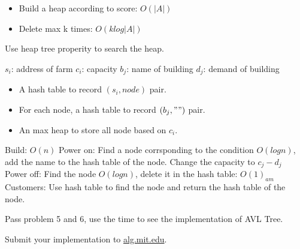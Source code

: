 \documentclass[12pt,twoside]{article}
\begin{document}
\begin{problems}
\problem  %

\begin{problemparts}
\problempart %
\begin{itemize}
    \item Build a heap according to score: $O(|A|)$
    \item Delete max k times: $O(klog|A|)$
\end{itemize}


\problempart %
Use heap tree properity to search the heap.
\end{problemparts}

\problem  %
$s_i$: address of farm $c_i$: capacity $b_j$: name of building $d_j$: demand of building
\begin{itemize}
    \item A hash table to record $(s_i, node)$ pair.
    \item For each node, a hash table to record $(b_j, "")$ pair.
    \item An max heap to store all node based on $c_i$.
\end{itemize}
Build: $O(n)$
Power on: Find a node corrsponding to the condition $O(logn)$, add the name to 
the hash table of the node. Change the capacity to $c_j - d_j$
Power off: Find the node $O(logn)$, delete it in the hash table: $O(1)_{am}$
Customers: Use hash table to find the node and return the hash table of the node.

\newpage
\problem  %
Pass problem 5 and 6, use the time to see the implementation of AVL Tree.

\problem  %
\begin{problemparts}
\problempart %
\problempart %
\problempart %
\problempart Submit your implementation to {\small\url{alg.mit.edu}}.
\end{problemparts}

\end{problems}
\end{document}
